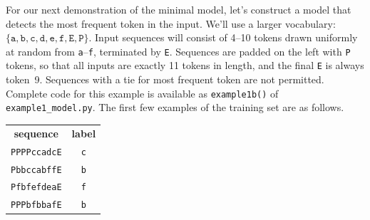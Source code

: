 \documentclass{article}
\newcommand{\ta}{\mathtt{a}}
\newcommand{\tb}{\mathtt{b}}
\newcommand{\tc}{\mathtt{c}}
\newcommand{\td}{\mathtt{d}}
\newcommand{\te}{\mathtt{e}}
\newcommand{\tf}{\mathtt{f}}
\newcommand{\tE}{\mathtt{E}}
\newcommand{\tP}{\mathtt{P}}
\begin{document}
For our next demonstration of the minimal model, let's construct a
model that detects the most frequent token in the input. We'll use a
larger vocabulary: $\{\ta, \tb, \tc, \td, \te, \tf, \tE, \tP\}$. Input
sequences will consist of 4--10 tokens drawn uniformly at random from
\texttt{a}--\texttt{f}, terminated by \texttt{E}. Sequences are padded
on the left with \texttt{P} tokens, so
that all inputs are exactly 11 tokens in length, and the final \texttt{E} is always token~9. Sequences with a tie
for most frequent token are not permitted. Complete code for this
example is available as \texttt{example1b()} of
\texttt{example1\_model.py}. The first few examples of the training
set are as follows.
\begin{center}
\begin{tabular}{cc}
  \textbf{sequence} & \textbf{label} \\
  \texttt{PPPPccadcE} & \texttt{c} \\
  \texttt{PbbccabffE} & \texttt{b} \\
  \texttt{PfbfefdeaE} & \texttt{f} \\
  \texttt{PPPbfbbafE} & \texttt{b} \\
\end{tabular}
\end{center}
\end{document}
